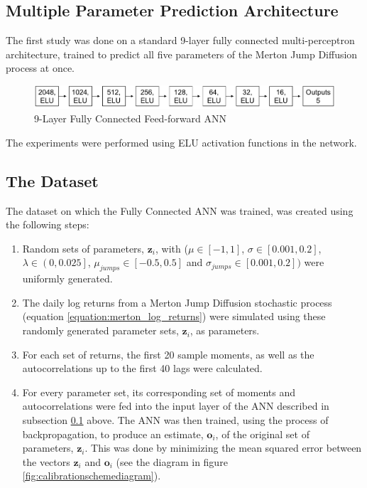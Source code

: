 \documentclass[11pt,oneside,openany,a4paper,english, report, goldenblock
]{usthesis}
\begin{document}
\subsection{Multiple Parameter Prediction Architecture} \label{subsection:fully_connected_ff_nn:architecture}
The first study was done on a standard 9-layer fully connected multi-perceptron architecture, trained to predict all five parameters of the Merton Jump Diffusion process at once.

\begin{figure}[h]
	\centering
	\includegraphics[width=1\linewidth]{Images/Diagrams/Network-Structures/MultipleOutputFullyConnectedANN}
	\caption[Multiple Output Prediction ANN]{9-Layer Fully Connected Feed-forward ANN}
	\label{fig:multipleoutputcnn}
\end{figure}

The experiments were performed using ELU activation functions in the network.

\subsection{The Dataset}

The dataset on which the Fully Connected ANN was trained, was created using the following steps:
\begin{enumerate}[1)]
	\itemsep0em 
	\item  Random sets of parameters, $\mathbf{z}_i$, with ($\mu \in \left[-1, 1\right]$, $\sigma \in \left[0.001, 0.2\right]$, $\lambda \in \left(0, 0.025\right]$, $\mu_{jumps} \in \left[-0.5, 0.5\right]$ and $\sigma_{jumps} \in \left[0.001, 0.2\right])$ were uniformly generated.
	\item  The daily log returns from a Merton Jump Diffusion stochastic process (equation \ref{equation:merton_log_returns}) were simulated using these randomly generated parameter sets, $\mathbf{z}_i$, as parameters.
	\item  For each set of returns, the first 20 sample moments, as well as the autocorrelations up to the first 40 lags were calculated.
	\item For every parameter set, its corresponding set of moments and autocorrelations were fed into the input layer of the ANN described in subsection \ref{subsection:fully_connected_ff_nn:architecture} above. The ANN was then trained, using the process of backpropagation, to produce an estimate, $\mathbf{o}_i$, of the original set of parameters, $\mathbf{z}_i$. This was done by minimizing the mean squared error between the vectors $\mathbf{z}_i$ and $\mathbf{o}_i$ (see the diagram in figure \ref{fig:calibrationschemediagram}).
\end{enumerate}
\end{document}
